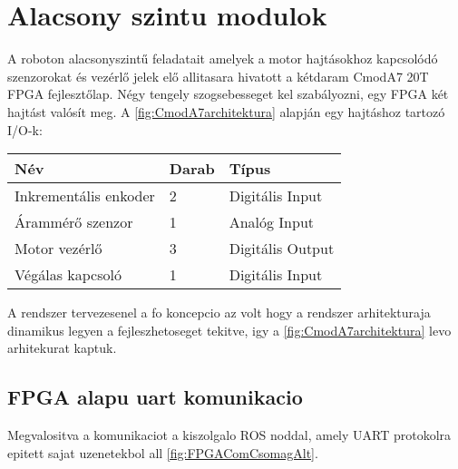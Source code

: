 
\section{Alacsony szintu modulok} 

A roboton alacsonyszintű feladatait amelyek a motor hajtásokhoz kapcsolódó szenzorokat és vezérlő jelek elő allitasara hivatott a kétdaram CmodA7 20T FPGA fejlesztőlap. Négy tengely szogsebesseget kel szabályozni, egy FPGA két hajtást valósít meg. A \ref{fig:CmodA7architektura} alapján egy hajtáshoz tartozó I/O-k:

\begin{table}[H]
\center
\begin{tabular}{lll}
\hline Név                            & Darab              & Típus  \\ \hline
Inkrementális enkoder           & 2           & Digitális Input \\
Árammérő szenzor                & 1                  & Analóg Input \\
Motor vezérlő                   & 3                  & Digitális Output \\
Végálas kapcsoló                 & 1                  & Digitális Input        
\end{tabular}
\end{table}




\renewcommand{\img}{SajatRobot/SzerkAbrak/cmoda7modulok.jpg}
\renewcommand{\sources}{*}
\renewcommand{\captionn}{CmodA7 FPGA-ban kialakított architektúra amely a szenzorok és motor hajtások kezelésre hivatott }
\renewcommand{\figlabel}{CmodA7architektura}


A rendszer tervezesenel a fo koncepcio az volt hogy a rendszer arhitekturaja dinamikus legyen a fejleszhetoseget tekitve, igy a \ref{fig:CmodA7architektura} levo arhitekurat kaptuk. 


\renewcommand{\img}{SajatRobot/FPGAmodulok/uBlazeAndFpgaUML.jpg}
\renewcommand{\sources}{*}
\renewcommand{\captionn}{MicroBlaze proceszoron futo szoftver diagramja}
\renewcommand{\figlabel}{MicroblazeSoft}





\subsection{FPGA alapu uart komunikacio}
\label{FPGAcomuSection}
Megvalositva a komunikaciot a kiszolgalo ROS noddal, amely UART protokolra epitett sajat uzenetekbol all \ref{fig:FPGAComCsomagAlt}.

